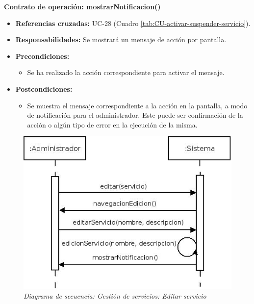 \textbf{Contrato de operación: mostrarNotificacion()}
\begin{itemize}
\item \textbf{Referencias cruzadas:} UC-28 (Cuadro \ref{tab:CU-activar-suspender-servicio}).
\item \textbf{Responsabilidades:} Se mostrará un mensaje de acción por pantalla.
\item \textbf{Precondiciones:} 
 \begin{itemize}
\item Se ha realizado la acción correspondiente para activar el mensaje.
\end {itemize}
\item \textbf{Postcondiciones:} 
 \begin{itemize}
\item Se muestra el mensaje correspondiente a la acción en la pantalla, a modo de notificación para el administrador. Este puede ser confirmación de la acción o algún tipo de error en la ejecución de la misma.
\end {itemize}
\end {itemize}


\vspace{10mm}

\begin{figure}[H]
\centering
  \includegraphics[scale=.55]{img/secuencias/gestion-servicios-editar-servicio.jpeg}
  \caption{\textit{Diagrama de secuencia: Gestión de servicios: Editar servicio}}
  \label{fig:secuencia-gestion-servicios-editar-servicio}
\end{figure}

